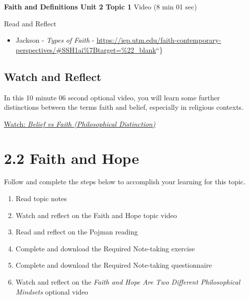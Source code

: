\documentclass[
]{book}
\providecommand{\tightlist}{%
  \setlength{\itemsep}{0pt}\setlength{\parskip}{0pt}}
\begin{document}
\textbf{Faith and Definitions Unit 2 Topic 1} Video (8 min 01 sec)

Read and Reflect

\begin{itemize}
\tightlist
\item
  Jackson - \emph{Types of Faith} - \url{https://iep.utm.edu/faith-contemporary-perspectives/\#SSH1ai\%7Btarget=\%22_blank}``\}
\end{itemize}

\hypertarget{watch-and-reflect-10}{%
\subsection*{Watch and Reflect}\label{watch-and-reflect-10}}

\begin{reflect}
In this 10 minute 06 second optional video, you will learn some further distinctions between the terms faith and belief, especially in religious contexts.

\href{https://www.youtube.com/watch?v=o8QKkHWUSu0}{Watch: \emph{Belief vs Faith (Philosophical Distinction)}}
\end{reflect}

\hypertarget{faith-and-hope}{%
\section*{2.2 Faith and Hope}\label{faith-and-hope}}

Follow and complete the steps below to accomplish your learning for this topic.

\begin{enumerate}
\def\labelenumi{\arabic{enumi}.}
\tightlist
\item
  Read topic notes
\item
  Watch and reflect on the Faith and Hope topic video
\item
  Read and reflect on the Pojman reading
\item
  Complete and download the Required Note-taking exercise
\item
  Complete and download the Required Note-taking questionnaire
\item
  Watch and reflect on the \emph{Faith and Hope Are Two Different Philosophical Mindsets} optional video
\end{enumerate}
\end{document}
